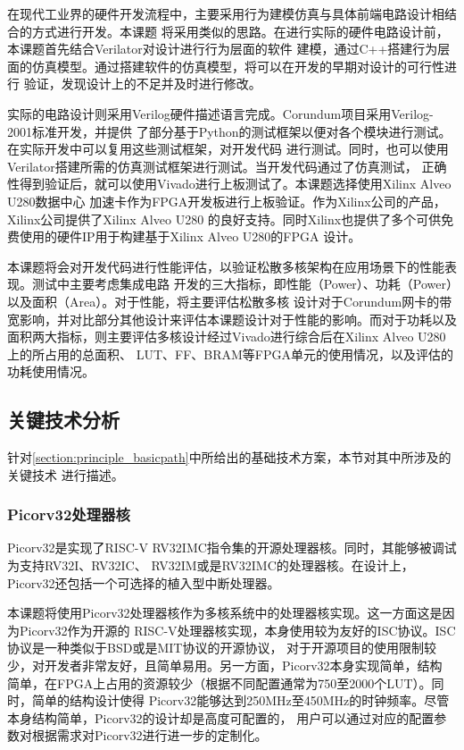 在现代工业界的硬件开发流程中，主要采用行为建模仿真与具体前端电路设计相结合的方式进行开发。本课题
将采用类似的思路。在进行实际的硬件电路设计前，本课题首先结合Verilator对设计进行行为层面的软件
建模，通过C++搭建行为层面的仿真模型。通过搭建软件的仿真模型，将可以在开发的早期对设计的可行性进行
验证，发现设计上的不足并及时进行修改。

实际的电路设计则采用Verilog硬件描述语言完成。Corundum项目采用Verilog-2001标准开发，并提供
了部分基于Python的测试框架以便对各个模块进行测试。在实际开发中可以复用这些测试框架，对开发代码
进行测试。同时，也可以使用Verilator搭建所需的仿真测试框架进行测试。当开发代码通过了仿真测试，
正确性得到验证后，就可以使用Vivado进行上板测试了。本课题选择使用Xilinx Alveo U280数据中心
加速卡作为FPGA开发板进行上板验证。作为Xilinx公司的产品，Xilinx公司提供了Xilinx Alveo U280
的良好支持。同时Xilinx也提供了多个可供免费使用的硬件IP用于构建基于Xilinx Alveo U280的FPGA
设计。

本课题将会对开发代码进行性能评估，以验证松散多核架构在应用场景下的性能表现。测试中主要考虑集成电路
开发的三大指标，即性能（Power）、功耗（Power）以及面积（Area）。对于性能，将主要评估松散多核
设计对于Corundum网卡的带宽影响，并对比部分其他设计来评估本课题设计对于性能的影响。而对于功耗以及
面积两大指标，则主要评估多核设计经过Vivado进行综合后在Xilinx Alveo U280上的所占用的总面积、
LUT、FF、BRAM等FPGA单元的使用情况，以及评估的功耗使用情况。

\subsection{关键技术分析}

针对\autoref{section:principle_basicpath}中所给出的基础技术方案，本节对其中所涉及的关键技术
进行描述。

\subsubsection{Picorv32处理器核}
\label{section:principle_picorv32}

Picorv32是实现了RISC-V RV32IMC指令集的开源处理器核。同时，其能够被调试为支持RV32I、RV32IC、
RV32IM或是RV32IMC的处理器核。在设计上，Picorv32还包括一个可选择的植入型中断处理器\cite{picorv32}。

本课题将使用Picorv32处理器核作为多核系统中的处理器核实现。这一方面这是因为Picorv32作为开源的
RISC-V处理器核实现，本身使用较为友好的ISC协议。ISC协议是一种类似于BSD或是MIT协议的开源协议，
对于开源项目的使用限制较少，对开发者非常友好，且简单易用。另一方面，Picorv32本身实现简单，结构
简单，在FPGA上占用的资源较少（根据不同配置通常为750至2000个LUT）。同时，简单的结构设计使得
Picorv32能够达到250MHz至450MHz的时钟频率。尽管本身结构简单，Picorv32的设计却是高度可配置的，
用户可以通过对应的配置参数对根据需求对Picorv32进行进一步的定制化。

